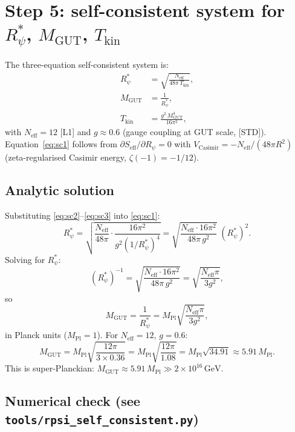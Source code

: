 \documentclass[12pt,a4paper]{article}
\theoremstyle{remark}
\begin{document}
\section{Step 5: self-consistent system for \(R_\psi^*\), \(M_{\mathrm{GUT}}\), \(T_{\mathrm{kin}}\)}
\label{sec:self_consistent}

The three-equation self-consistent system is:
\begin{align}
R_\psi^* &= \sqrt{\frac{N_{\mathrm{eff}}}{48\pi\,T_{\mathrm{kin}}}},
  \label{eq:sc1}\\
M_{\mathrm{GUT}} &= \frac{1}{R_\psi^*},
  \label{eq:sc2}\\
T_{\mathrm{kin}} &= \frac{g^2\,M_{\mathrm{GUT}}^4}{16\pi^2},
  \label{eq:sc3}
\end{align}
with $N_{\mathrm{eff}}=12$ [L1] and $g\approx0.6$ (gauge coupling at GUT scale,
[STD]).  Equation~\eqref{eq:sc1} follows from \(\partial S_{\mathrm{eff}}/\partial
R_\psi=0\) with $V_{\mathrm{Casimir}}=-N_{\mathrm{eff}}/(48\pi R^2)$
(zeta-regularised Casimir energy, \(\zeta(-1)=-1/12\)).

\subsection*{Analytic solution}

Substituting \eqref{eq:sc2}--\eqref{eq:sc3} into \eqref{eq:sc1}:
\[
R_\psi^* = \sqrt{\frac{N_{\mathrm{eff}}}{48\pi}\cdot\frac{16\pi^2}{g^2 (1/R_\psi^*)^4}}
= \sqrt{\frac{N_{\mathrm{eff}}\cdot 16\pi^2}{48\pi\,g^2}}\;(R_\psi^*)^2.
\]
Solving for $R_\psi^*$:
\[
(R_\psi^*)^{-1} = \sqrt{\frac{N_{\mathrm{eff}}\cdot 16\pi^2}{48\pi\,g^2}}
= \sqrt{\frac{N_{\mathrm{eff}}\pi}{3g^2}},
\]
so
\begin{equation}
  M_{\mathrm{GUT}} = \frac{1}{R_\psi^*} = M_{\mathrm{Pl}}\sqrt{\frac{N_{\mathrm{eff}}\pi}{3g^2}},
  \label{eq:mgut_analytic}
\end{equation}
in Planck units ($M_{\mathrm{Pl}}=1$). For $N_{\mathrm{eff}}=12$, $g=0.6$:
\[
M_{\mathrm{GUT}} = M_{\mathrm{Pl}}\sqrt{\frac{12\pi}{3\times0.36}} = M_{\mathrm{Pl}}\sqrt{\frac{12\pi}{1.08}} = M_{\mathrm{Pl}}\sqrt{34.91}\approx 5.91\,M_{\mathrm{Pl}}.
\]
This is super-Planckian: \(M_{\mathrm{GUT}}\approx5.91\,M_{\mathrm{Pl}}\gg 2\times10^{16}\,\mathrm{GeV}\).

\subsection*{Numerical check (see \texttt{tools/rpsi\_self\_consistent.py})}
\end{document}
